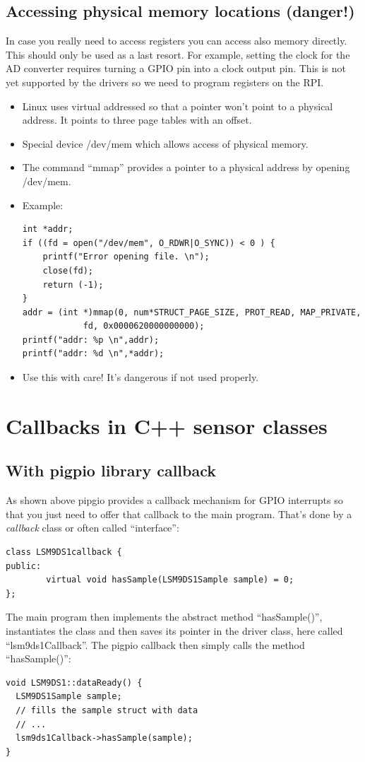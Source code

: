 \documentclass[12pt]{report}
\begin{document}
\subsection{Accessing physical memory locations (danger!)}
In case you really need to access registers you can access
also memory directly. This should only be used as a last resort.
For example, setting the clock for the AD converter requires
turning a GPIO pin into a clock output pin. This is not yet
supported by the drivers so we need to program registers
on the RPI.
\begin{itemize}
\item Linux uses virtual addressed so that a pointer won't
point to a physical address. It points to three page
tables with an offset.
\item Special device /dev/mem which allows access of physical
memory.
\item The command ``mmap'' provides a pointer to a physical
address by opening /dev/mem.
\item Example:
\begin{verbatim}
int *addr;
if ((fd = open("/dev/mem", O_RDWR|O_SYNC)) < 0 ) {
    printf("Error opening file. \n");
    close(fd);
    return (-1);
}
addr = (int *)mmap(0, num*STRUCT_PAGE_SIZE, PROT_READ, MAP_PRIVATE,
            fd, 0x0000620000000000);
printf("addr: %p \n",addr);
printf("addr: %d \n",*addr);
\end{verbatim}
\item Use this with care! It's dangerous if not used properly.
\end{itemize}




\section{Callbacks in C++ sensor classes}
\subsection{With pigpio library callback}
As shown above pipgio provides a callback mechanism for GPIO interrupts
so that you just need
to offer that callback to the main program. That's done by a \textsl{callback}
class or often called ``interface'':
\begin{verbatim}
class LSM9DS1callback {
public:
        virtual void hasSample(LSM9DS1Sample sample) = 0;
};
\end{verbatim}

The main program then implements the abstract method ``hasSample()'', instantiates
the class and then saves its pointer in the driver class, here called ``lsm9ds1Callback''.
The pigpio callback then simply calls the method ``hasSample()'':
\begin{verbatim}
void LSM9DS1::dataReady() {
  LSM9DS1Sample sample;
  // fills the sample struct with data
  // ...
  lsm9ds1Callback->hasSample(sample);
}
\end{verbatim}
\end{document}
